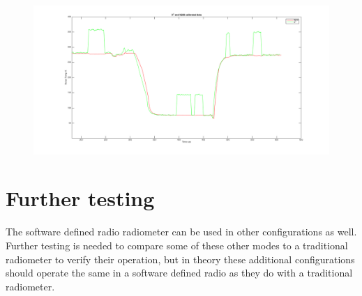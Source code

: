 \begin{figure}[h!tb] \centering

\includegraphics[width=\textwidth]{Images/moneyshot.png}

\label{sdr_x2_filter}
\end{figure} 

\section{Further testing}
The software defined radio radiometer can be used in other configurations as well.  Further testing is needed to compare some of these other modes to a traditional radiometer to verify their operation, but in theory these additional configurations should operate the same in a software defined radio as they do with a traditional radiometer.